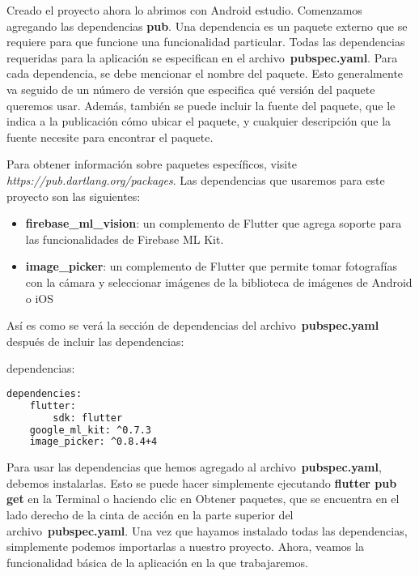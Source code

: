 Creado el proyecto ahora lo abrimos con Android estudio. Comenzamos agregando las dependencias \textbf{pub}. Una dependencia es un paquete externo que se requiere para que funcione una funcionalidad particular. Todas las dependencias requeridas para la aplicación se especifican en el archivo \textbf{pubspec.yaml}. Para cada dependencia, se debe mencionar el nombre del paquete. Esto generalmente va seguido de un número de versión que especifica qué versión del paquete queremos usar. Además, también se puede incluir la fuente del paquete, que le indica a la publicación cómo ubicar el paquete, y cualquier descripción que la fuente necesite para encontrar el paquete.

Para obtener información sobre paquetes específicos, visite \textit{https://pub.dartlang.org/packages}. Las dependencias que usaremos para este proyecto son las siguientes:

\begin{itemize}
	\item \textbf{firebase\_ml\_vision}: un complemento de Flutter que agrega soporte para las funcionalidades de Firebase ML Kit.
	\item \textbf{image\_picker}: un complemento de Flutter que permite tomar fotografías con la cámara y seleccionar imágenes de la biblioteca de imágenes de Android o iOS
\end{itemize}



Así es como se verá la sección de dependencias del archivo \textbf{pubspec.yaml} después de incluir las dependencias:

dependencias:

\begin{lstlisting}[language=bash]
dependencies:
	flutter:
		sdk: flutter
	google_ml_kit: ^0.7.3
	image_picker: ^0.8.4+4
\end{lstlisting} 

Para usar las dependencias que hemos agregado al archivo \textbf{pubspec.yaml}, debemos instalarlas. Esto se puede hacer simplemente ejecutando \textbf{flutter pub get} en la Terminal o haciendo clic en Obtener paquetes, que se encuentra en el lado derecho de la cinta de acción en la parte superior del archivo \textbf{pubspec.yaml}. Una vez que hayamos instalado todas las dependencias, simplemente podemos importarlas a nuestro proyecto. Ahora, veamos la funcionalidad básica de la aplicación en la que trabajaremos.


